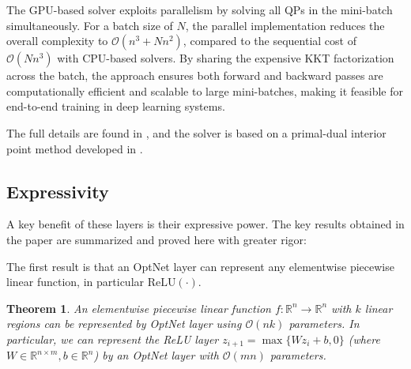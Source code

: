\documentclass{article}
\newtheorem{theorem}{Theorem}
\begin{document}
The GPU-based solver exploits parallelism by solving all QPs in the mini-batch simultaneously. For a batch size of \( N \), the parallel implementation reduces the overall complexity to \( \mathcal{O}(n^3 + N n^2) \), compared to the sequential cost of \( \mathcal{O}(N n^3) \) with CPU-based solvers. By sharing the expensive KKT factorization across the batch, the approach ensures both forward and backward passes are computationally efficient and scalable to large mini-batches, making it feasible for end-to-end training in deep learning systems.

 The full details are found in \citet{optnet}, and the solver is based on a primal-dual interior point method developed in \citet{mattingley2012cvxgen}.

\subsection{Expressivity}

A key benefit of these layers is their expressive power. The key results obtained in the paper are summarized and proved here with greater rigor:

The first result is that an OptNet layer can represent any  elementwise piecewise linear function, in particular $\text{ReLU}(\cdot)$.

\begin{theorem}
    An elementwise piecewise linear function $f: \mathbb{R}^n \to \mathbb{R}^{n}$ with $k$ linear regions can be represented by OptNet layer using $\mathcal{O}(nk)$ parameters. In particular, we can represent the ReLU layer $z_{i+1} = \max\{Wz_i + b, 0\}$ (where $W \in \mathbb{R}^{n \times m}, b \in \mathbb{R}^n$) by an OptNet layer with $\mathcal{O}(mn)$ parameters. 
\end{theorem}
\end{document}
